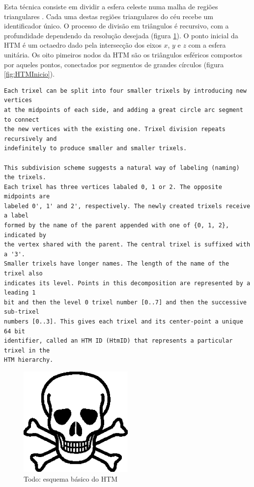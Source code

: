 Esta técnica consiste em dividir a esfera celeste numa malha de regiões
triangulares \citep{Kunszt2001}. Cada uma destas regiões triangulares do céu
recebe um identificador único. O processo de divisão em triângulos é recursivo,
com a profundidade dependendo da resolução desejada (figura
\ref{fig:HTMBasico}). O ponto inicial da HTM é um octaedro dado pela intersecção
dos eixos $x$, $y$ e $z$ com a esfera unitária. Os oito pimeiros nodos da HTM
são os triângulos esféricos compostos por aqueles pontos, conectados por
segmentos de grandes círculos (figura \ref{fig:HTMInicio}).

\begin{verbatim}
Each trixel can be split into four smaller trixels by introducing new vertices
at the midpoints of each side, and adding a great circle arc segment to connect
the new vertices with the existing one. Trixel division repeats recursively and
indefinitely to produce smaller and smaller trixels.

This subdivision scheme suggests a natural way of labeling (naming) the trixels.
Each trixel has three vertices labaled 0, 1 or 2. The opposite midpoints are
labeled 0', 1' and 2', respectively. The newly created trixels receive a label
formed by the name of the parent appended with one of {0, 1, 2}, indicated by
the vertex shared with the parent. The central trixel is suffixed with a '3'.
Smaller trixels have longer names. The length of the name of the trixel also
indicates its level. Points in this decomposition are represented by a leading 1
bit and then the level 0 trixel number [0..7] and then the successive sub-trixel
numbers [0..3]. This gives each trixel and its center-point a unique 64 bit
identifier, called an HTM ID (HtmID) that represents a particular trixel in the
HTM hierarchy.
\end{verbatim}

\begin{figure}
	\includegraphics[width=0.5\textwidth]{figuras/test.eps}
	\caption[Todo: esquema básico do HTM]
	{Todo: esquema básico do HTM}
	\label{fig:HTMBasico}
\end{figure}

